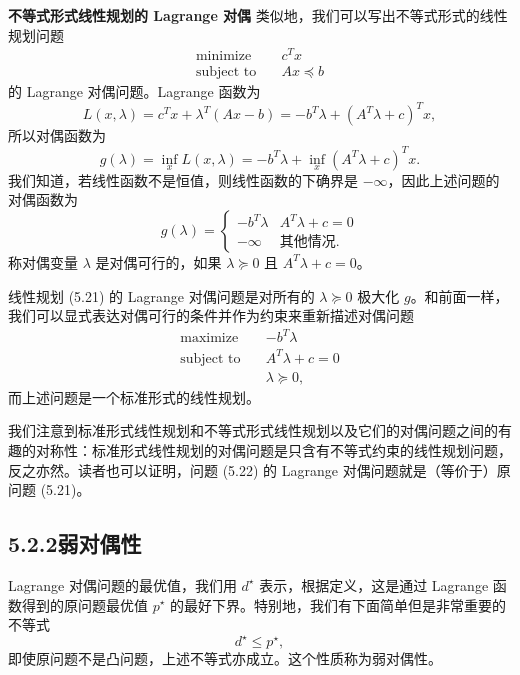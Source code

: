 \documentclass[UTF8,12pt,a4paper,fontset=fandol]{ctexart}
\begin{document}
\noindent\textbf{不等式形式线性规划的 Lagrange 对偶}\quad
类似地，我们可以写出不等式形式的线性规划问题
\begin{equation}
\begin{aligned}
\text{minimize}\quad & c^Tx\\
\text{subject to}\quad & Ax\preceq b
\end{aligned}
\tag{5.21}
\end{equation}
的 Lagrange 对偶问题。Lagrange 函数为
\[
L(x,\lambda)=c^Tx+\lambda^T(Ax-b)=-b^T\lambda+(A^T\lambda+c)^Tx,
\]
所以对偶函数为
\[
g(\lambda)=\inf_x L(x,\lambda)=-b^T\lambda+\inf_x(A^T\lambda+c)^Tx.
\]
我们知道，若线性函数不是恒值，则线性函数的下确界是 $-\infty$，因此上述问题的对偶函数为
\[
g(\lambda)=
\begin{cases}
-b^T\lambda & A^T\lambda+c=0\\
-\infty & \text{其他情况}.
\end{cases}
\]
称对偶变量 $\lambda$ 是对偶可行的，如果 $\lambda\succeq 0$ 且 $A^T\lambda+c=0$。

线性规划 (5.21) 的 Lagrange 对偶问题是对所有的 $\lambda\succeq 0$ 极大化 $g$。和前面一样，我们可以显式表达对偶可行的条件并作为约束来重新描述对偶问题
\begin{equation}
\begin{aligned}
\text{maximize}\quad & -b^T\lambda\\
\text{subject to}\quad & A^T\lambda+c=0\\
& \lambda\succeq 0,
\end{aligned}
\tag{5.22}
\end{equation}
而上述问题是一个标准形式的线性规划。

我们注意到标准形式线性规划和不等式形式线性规划以及它们的对偶问题之间的有趣的对称性：标准形式线性规划的对偶问题是只含有不等式约束的线性规划问题，反之亦然。读者也可以证明，问题 (5.22) 的 Lagrange 对偶问题就是（等价于）原问题 (5.21)。

\subsection*{5.2.2\quad 弱对偶性}

Lagrange 对偶问题的最优值，我们用 $d^\star$ 表示，根据定义，这是通过 Lagrange 函数得到的原问题最优值 $p^\star$ 的最好下界。特别地，我们有下面简单但是非常重要的不等式
\begin{equation}
d^\star\leq p^\star,
\tag{5.23}
\end{equation}
即使原问题不是凸问题，上述不等式亦成立。这个性质称为弱对偶性。
\end{document}
